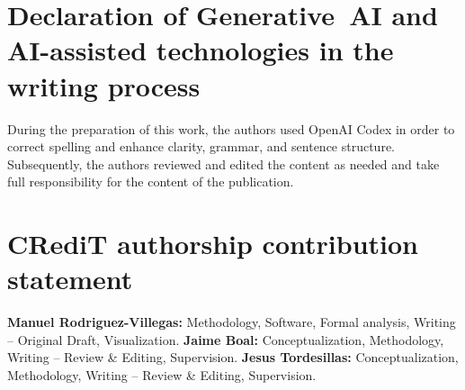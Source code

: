 \documentclass[5p,twocolumn,nonatbib,reversenotenum]{elsarticle}
\begin{document}
\section*{Declaration of Generative~AI and AI-assisted technologies in the writing process}
During the preparation of this work, the authors used OpenAI Codex in order to correct spelling and enhance clarity, grammar, and sentence structure. Subsequently, the authors reviewed and edited the content as needed and take full responsibility for the content of the publication.

\section*{CRediT authorship contribution statement}
\textbf{Manuel Rodriguez-Villegas:} Methodology, Software, Formal analysis, Writing – Original Draft, Visualization. \textbf{Jaime Boal:} Conceptualization, Methodology, Writing – Review \& Editing, Supervision. \textbf{Jesus Tordesillas:} Conceptualization, Methodology, Writing – Review \& Editing, Supervision.

\FloatBarrier

\balance


\end{document}
